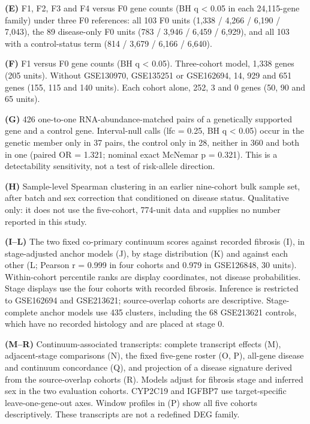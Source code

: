 \textbf{(E)} F1, F2, F3 and F4 versus F0 gene counts (BH q \textless{} 0.05 in each 24,115-gene family) under three F0 references: all 103 F0 units (1,338 / 4,266 / 6,190 / 7,043), the 89 disease-only F0 units (783 / 3,946 / 6,459 / 6,929), and all 103 with a control-status term (814 / 3,679 / 6,166 / 6,640).

\textbf{(F)} F1 versus F0 gene counts (BH q \textless{} 0.05). Three-cohort model, 1,338 genes (205 units). Without GSE130970, GSE135251 or GSE162694, 14, 929 and 651 genes (155, 115 and 140 units). Each cohort alone, 252, 3 and 0 genes (50, 90 and 65 units).

\textbf{(G)} 426 one-to-one RNA-abundance-matched pairs of a genetically supported gene and a control gene. Interval-null calls (lfc = 0.25, BH q \textless{} 0.05) occur in the genetic member only in 37 pairs, the control only in 28, neither in 360 and both in one (paired OR = 1.321; nominal exact McNemar p = 0.321). This is a detectability sensitivity, not a test of risk-allele direction.

\textbf{(H)} Sample-level Spearman clustering in an earlier nine-cohort bulk sample set, after batch and sex correction that conditioned on disease status. Qualitative only: it does not use the five-cohort, 774-unit data and supplies no number reported in this study.

\textbf{(I--L)} The two fixed co-primary continuum scores against recorded fibrosis (I), in stage-adjusted anchor models (J), by stage distribution (K) and against each other (L; Pearson r = 0.999 in four cohorts and 0.979 in GSE126848, 30 units). Within-cohort percentile ranks are display coordinates, not disease probabilities. Stage displays use the four cohorts with recorded fibrosis. Inference is restricted to GSE162694 and GSE213621; source-overlap cohorts are descriptive. Stage-complete anchor models use 435 clusters, including the 68 GSE213621 controls, which have no recorded histology and are placed at stage 0.

\textbf{(M--R)} Continuum-associated transcripts: complete transcript effects (M), adjacent-stage comparisons (N), the fixed five-gene roster (O, P), all-gene disease and continuum concordance (Q), and projection of a disease signature derived from the source-overlap cohorts (R). Models adjust for fibrosis stage and inferred sex in the two evaluation cohorts. CYP2C19 and IGFBP7 use target-specific leave-one-gene-out axes. Window profiles in (P) show all five cohorts descriptively. These transcripts are not a redefined DEG family.


